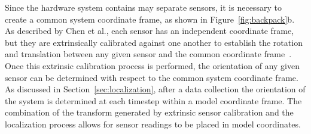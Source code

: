\documentclass[12pt,onecolumn,oneside]{book}
\begin{document}



Since the hardware system contains may separate sensors, it is necessary to create a common system coordinate frame, as shown in Figure~\ref{fig:backpack}b.  As described by Chen et al., each sensor has an independent coordinate frame, but they are extrinsically calibrated against one another to establish the rotation and translation between any given sensor and the common coordinate frame~\cite{Backpack}.  Once this extrinsic calibration process is performed, the orientation of any given sensor can be determined with respect to the common system coordinate frame.  As discussed in Section~\ref{sec:localization}, after a data collection the orientation of the system is determined at each timestep within a model coordinate frame.  The combination of the transform generated by extrinsic sensor calibration and the localization process allows for sensor readings to be placed in model coordinates.
\end{document}
